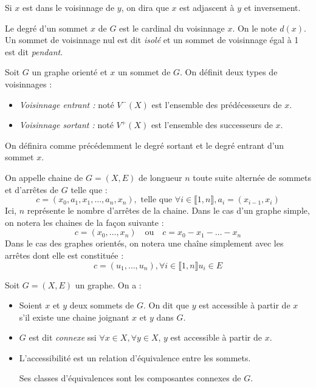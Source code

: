 \begin{remark}
    Si $x$ est dans le voisinnage de $y$, on dira que $x$ est adjascent à $y$ et inversement.
\end{remark}

\begin{definition}[Degré]
    Le degré d'un sommet $x$ de $G$ est le cardinal du voisinnage $x$. On le note $d(x)$.
    Un sommet de voisinnage nul est dit \emph{isolé} et un sommet de voisinnage égal à 1 est dit \emph{pendant}.
\end{definition}

\begin{definition}
    Soit $G$ un graphe orienté et $x$ un sommet de $G$. On définit deux types de voisinnages :
    \begin{itemize}
        \item \emph{Voisinnage entrant :} noté $V^-(X)$ est l'ensemble des prédécesseurs de $x$.
        \item \emph{Voisinnage sortant :} noté $V^+(X)$ est l'ensemble des successeurs de $x$.
    \end{itemize}
    On définira comme précédemment le degré sortant et le degré entrant d'un sommet $x$.
\end{definition}


\begin{definition}[Chaine]
    On appelle chaine de $G = (X,E)$ de longueur $n$ toute suite alternée de sommets et d'arrêtes de $G$ telle que :
        \[ c = (x_0, a_1, x_1, \dots, a_n, x_n), \text{  telle que } \forall i \in \llbracket 1, n \rrbracket, a_i = (x_{i-1}, x_i) \]
    Ici, $n$ représente le nombre d'arrêtes de la chaine. Dans le cas d'un graphe simple, on notera les chaines de la façon suivante :
        \[ c = (x_0, \dots, x_n) \quad \text{ou} \quad c = x_0 - x_1 - \dots - x_n \] 
    Dans le cas des graphes orientés, on notera une chaîne simplement avec les arrêtes dont elle est constituée : 
        $$ c = (u_1, \dots, u_n), \forall i \in \llbracket 1, n \rrbracket u_i \in E $$
\end{definition}

\begin{definition}[Accessibilité]
    Soit $G = (X,E)$ un graphe. On a :
    \begin{itemize}
        \item Soient $x$ et $y$ deux sommets de $G$. On dit que $y$ est accessible à partir de $x$ s'il existe une chaine joignant $x$ et $y$ dans $G$.
        \item $G$ est dit \emph{connexe} ssi $ \forall x \in X, \forall y \in X$, $y$ est accessible à partir de $x$.
        \item L'accessibilité est un relation d'équivalence entre les sommets. 
        
        Ses classes d'équivalences sont les composantes connexes de $G$.
    \end{itemize}
\end{definition}

